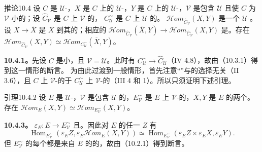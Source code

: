 \begin{SGAresult}{推论}{10.4}
设 $C$ 是 $\mathcal U$-，$X$ 是 $C$ 上的 $\mathcal U$-，$Y$ 是 $C$ 上的 $\mathcal U$-，$\mathcal V$ 是包含 $\mathcal U$ 且使 $C$ 为 $\mathcal V$-小的；设 $\widehat C_{\mathcal V}$ 是 $C$ 上 $\mathcal V$-的，
$C^{\sim}_{\mathcal U}$ 是 $C$ 上 $\mathcal U$-的。 $\mathscr{H}\!om_{\widehat C_{\mathcal V}}(X,Y)$ 是一个 $\mathcal U$-。设 $X\to\overline X$ 是 $X$ 到其的；相应的
$\mathscr{H}\!om_{\widehat C_{\mathcal V}}(\overline X,Y)\to\mathscr{H}\!om_{\widehat C_{\mathcal V}}(X,Y)$ 是。存在
$\mathscr{H}\!om_{\widehat C_{\mathcal V}}(X,Y)\simeq\mathscr{H}\!om_{C^{\sim}_{\mathcal U}}(\overline X,Y)$。
\end{SGAresult}
\textbf{10.4.1。}先设 $C$ 是小，且 $\mathcal V=\mathcal U$。此时有 $C^{\sim}_{\mathcal U}\to\widehat C_{\mathcal U}$（IV 4.8），故由（10.3.1）得到这一情形的断言。
为由此过渡到一般情形，首先注意“”与的选择无关（II 3.6），且 $C$ 上 $\mathcal V$-的于 $C^{\sim}_{\mathcal U}$ 上 $\mathcal V$-的（III 4 和 1）。所以只须证明下述引理。
\begin{SGAresult}{引理}{10.4.2}
设 $E$ 是 $\mathcal U$-，$\mathcal V$ 是包含 $\mathcal U$ 的，$E^{\sim}_{\mathcal V}$ 是 $E$ 上 $\mathcal V$-的，$X,Y$ 是 $E$ 的两个。存在
$\mathscr{H}\!om_E(X,Y)\simeq\mathscr{H}\!om_{E^{\sim}_{\mathcal V}}(X,Y)$。
\end{SGAresult}
\textbf{10.4.3。} $\varepsilon_E:E\to E^{\sim}_{\mathcal V}$ 且。因此对 $E$ 的任一 $Z$ 有
\[
\operatorname{Hom}_{E^{\sim}_{\mathcal V}}(\varepsilon_E Z,\varepsilon_E\mathscr{H}\!om_E(X,Y))
\simeq\operatorname{Hom}_{E^{\sim}_{\mathcal V}}(\varepsilon_E Z\times\varepsilon_E X,\varepsilon_E Y).
\]
但 $E^{\sim}_{\mathcal V}$ 的每个都是来自 $E$ 的的，故由（10.2.1）得到断言。
